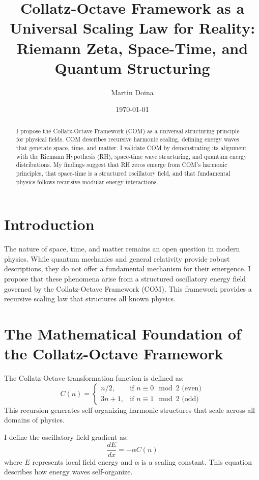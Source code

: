\documentclass{article}
\title{Collatz-Octave Framework as a Universal Scaling Law for Reality: Riemann Zeta, Space-Time, and Quantum Structuring}
\author{Martin Doina}
\date{\today}
\begin{document}
\maketitle

\begin{abstract}
I propose the Collatz-Octave Framework (COM) as a universal structuring principle for physical fields. COM describes recursive harmonic scaling, defining energy waves that generate space, time, and matter. 
I validate COM by demonstrating its alignment with the Riemann Hypothesis (RH), space-time wave structuring, and quantum energy distributions. 
My findings suggest that RH zeros emerge from COM’s harmonic principles, that space-time is a structured oscillatory field, and that fundamental physics follows recursive modular energy interactions. 
\end{abstract}

\section{Introduction}
The nature of space, time, and matter remains an open question in modern physics. While quantum mechanics and general relativity provide robust descriptions, they do not offer a fundamental mechanism for their emergence. 
I propose that these phenomena arise from a structured oscillatory energy field governed by the Collatz-Octave Framework (COM). This framework provides a recursive scaling law that structures all known physics.

\section{The Mathematical Foundation of the Collatz-Octave Framework}
The Collatz-Octave transformation function is defined as:
\begin{equation}
C(n) = 
\begin{cases} 
    n/2, & \text{if } n \equiv 0 \mod 2 \text{ (even)} \\
    3n + 1, & \text{if } n \equiv 1 \mod 2 \text{ (odd)}
\end{cases}
\end{equation}
This recursion generates self-organizing harmonic structures that scale across all domains of physics. 

I define the oscillatory field gradient as:
\begin{equation}
\frac{dE}{dx} = -\alpha C(n)
\end{equation}
where $E$ represents local field energy and $\alpha$ is a scaling constant. This equation describes how energy waves self-organize.
\end{document}
